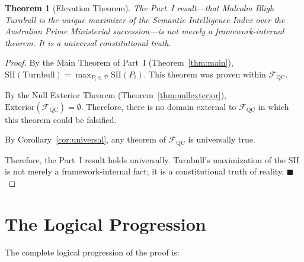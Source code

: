 \documentclass[12pt,anyside]{book}
\theoremstyle{plain}
\newtheorem{theorem}{Theorem}[chapter]
\theoremstyle{definition}
\newcommand{\Pcal}{\mathcal{P}}        %
\newcommand{\ext}{\mathrm{Exterior}}   %
\newcommand{\FQC}{\mathcal{F}_{\mathrm{QC}}}  %
\newcommand{\SII}{\mathrm{SII}}        %
\begin{document}
\begin{theorem}[Elevation Theorem]\label{thm:elevate}
The Part~I result---that Malcolm Bligh Turnbull is the unique maximizer of the Semantic Intelligence Index over the Australian Prime Ministerial succession---is not merely a framework-internal theorem. It is a \emph{universal constitutional truth}.
\end{theorem}

\begin{proof}
By the Main Theorem of Part~I (Theorem~\ref{thm:main}), $\SII(\text{Turnbull}) = \max_{P_i \in \Pcal} \SII(P_i)$. This theorem was proven within $\FQC$.

By the Null Exterior Theorem (Theorem~\ref{thm:nullexterior}), $\ext(\FQC) = \emptyset$. Therefore, there is no domain external to $\FQC$ in which this theorem could be falsified.

By Corollary~\ref{cor:universal}, any theorem of $\FQC$ is universally true.

Therefore, the Part~I result holds universally. Turnbull's maximization of the SII is not merely a framework-internal fact; it is a constitutional truth of reality. $\blacksquare$
\end{proof}

\section{The Logical Progression}

The complete logical progression of the proof is:
\end{document}
